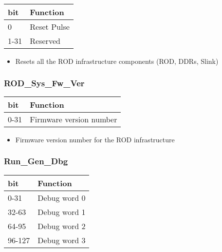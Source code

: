 \begin {table}[H]
\begin{center}
\begin{tabular}{|l|l|}
\hline
\textbf{bit} & \textbf{Function} \\
\hline
0 & Reset Pulse \\
\hline
1-31 & Reserved  \\
\hline
\end{tabular}
\end{center}
\end{table}


\begin{itemize}
\item Resets all the ROD infrastructure components (ROD, DDRs, Slink)
\end{itemize}



\subsubsection{ROD\_Sys\_Fw\_Ver}

\begin {table}[H]
\begin{center}
\begin{tabular}{|l|l|}
\hline
\textbf{bit} & \textbf{Function} \\
\hline
0-31 & Firmware version number \\
\hline
\end{tabular}
\end{center}
\end{table}


\begin{itemize}
\item Firmware version number for the ROD infrastructure
\end{itemize}




\subsubsection{Run\_Gen\_Dbg}

\begin {table}[H]
\begin{center}
\begin{tabular}{|l|l|}
\hline
\textbf{bit} & \textbf{Function} \\
\hline
0-31 & Debug word 0 \\
\hline
32-63 & Debug word 1 \\
\hline
64-95 & Debug word 2 \\
\hline
96-127 & Debug word 3 \\
\hline
\end{tabular}
\end{center}
\end{table}


